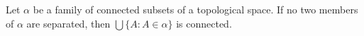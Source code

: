 Let $\alpha$ be a family of connected subsets of a topological space. If no two members of $\alpha$ are separated, then $\bigcup \{A : A \in \alpha\}$ is connected.
